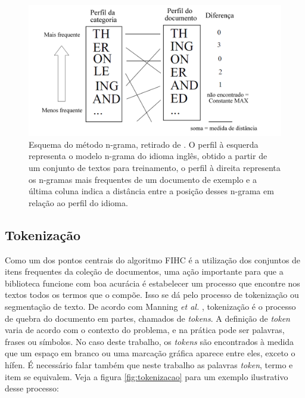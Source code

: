 \documentclass[a4paper,12pt]{article}
\begin{document}
\begin{figure}[h]
    \begin{center}
        \includegraphics[scale=0.4]{n_grama.png}
    \end{center}
    \caption{Esquema do método n-grama, retirado de \cite{Trenkle94}. O perfil à esquerda representa o modelo n-grama do idioma inglês, obtido a partir de um conjunto de textos para treinamento, o perfil à direita representa os n-gramas mais frequentes de um documento de exemplo e a última coluna indica a distância entre a posição desses n-grama em relação ao perfil do idioma.}
    \label{fig:metodo_n_grama}
\end{figure}

\subsection {Tokenização}
\label {sec:tokenizacao}

Como um dos pontos centrais do algoritmo FIHC é a utilização dos conjuntos de itens frequentes da coleção de documentos, uma ação importante para que a biblioteca funcione com boa acurácia é estabelecer um processo que encontre nos textos todos os termos que o compõe. Isso se dá pelo processo de tokenização ou segmentação de texto. De acordo com Manning \textit{et al.} \cite{Manning09}, tokenização é o processo de quebra do documento em partes, chamados de \textit{tokens}. A definição de \textit{token} varia de acordo com o contexto do problema, e na prática pode ser palavras, frases ou símbolos. No caso deste trabalho, os \textit{tokens} são encontrados à medida que um espaço em branco ou uma marcação gráfica aparece entre eles, exceto o hífen. É necessário falar também que neste trabalho as palavras \textit{token}, termo e item se equivalem. Veja a figura \ref{fig:tokenizacao} para um exemplo ilustrativo desse processo:
\end{document}
